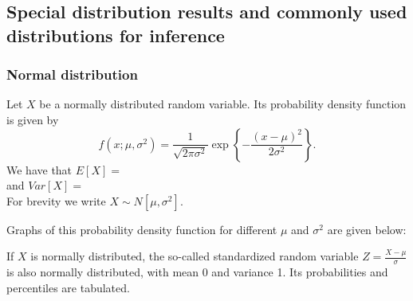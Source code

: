 \documentclass[12pt]{article}
\begin{document}
\subsection{Special distribution results and commonly used distributions for inference}


\subsubsection{Normal distribution}
Let $X$ be a normally distributed random variable. Its probability density function is given by $$f(x;\mu,\sigma^2) = \frac{1}{\sqrt{2\pi\sigma^2}} \exp \left\{ -\frac{(x-\mu)^2}{2\sigma^2} \right\}.$$
We have that $E[X]=$\\[20pt]
and $Var[X]=$\\[20pt]
For brevity we write $X \sim N[\mu,\sigma^2].$

Graphs of this probability density function for different $\mu$ and $\sigma^2$ are given below:

If $X$ is normally distributed, the so-called standardized random variable $\displaystyle Z=\frac{X-\mu}{\sigma}$ is also normally distributed, with mean 0 and variance 1. Its probabilities and percentiles are tabulated.

\end{document}
